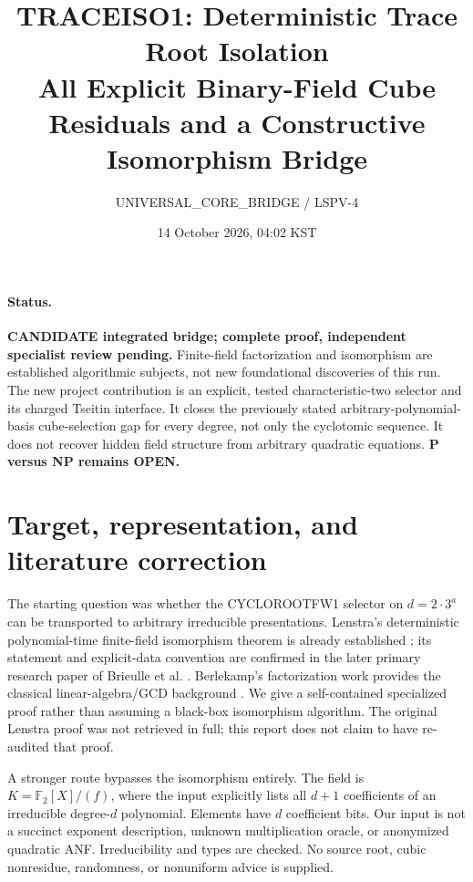 \documentclass[11pt]{article}
\title{TRACEISO1: Deterministic Trace Root Isolation\\\large All Explicit Binary-Field Cube Residuals and a Constructive Isomorphism Bridge}
\author{UNIVERSAL\_CORE\_BRIDGE / LSPV-4}
\date{14 October 2026, 04:02 KST}
\newcommand{\F}{\mathbb F}
\begin{document}
\maketitle
\paragraph{Status.}
\textbf{CANDIDATE integrated bridge; complete proof, independent specialist review pending.}
Finite-field factorization and isomorphism are established algorithmic subjects,
not new foundational discoveries of this run. The new project contribution is
an explicit, tested characteristic-two selector and its charged Tseitin interface.
It closes the previously stated arbitrary-polynomial-basis cube-selection gap
for every degree, not only the cyclotomic sequence. It does not recover hidden
field structure from arbitrary quadratic equations. \textbf{P versus NP remains OPEN.}

\section{Target, representation, and literature correction}
The starting question was whether the CYCLOROOTFW1 selector on
$d=2\cdot3^a$ can be transported to arbitrary irreducible presentations.
Lenstra's deterministic polynomial-time finite-field isomorphism theorem is
already established \cite{lenstra}; its statement and explicit-data convention
are confirmed in the later primary research paper of Brieulle et al.
\cite{brieulle}. Berlekamp's factorization work provides the classical
linear-algebra/GCD background \cite{berlekamp}. We give a self-contained
specialized proof rather than assuming a black-box isomorphism algorithm.
The original Lenstra proof was not retrieved in full; this report does not
claim to have re-audited that proof.

A stronger route bypasses the isomorphism entirely. The field is
$K=\F_2[X]/(f)$, where the input explicitly lists all $d+1$ coefficients of
an irreducible degree-$d$ polynomial. Elements have $d$ coefficient bits.
Our input is not a succinct exponent description, unknown multiplication
oracle, or anonymized quadratic ANF. Irreducibility and types are checked.
No source root, cubic nonresidue, randomness, or nonuniform advice is supplied.
\end{document}
